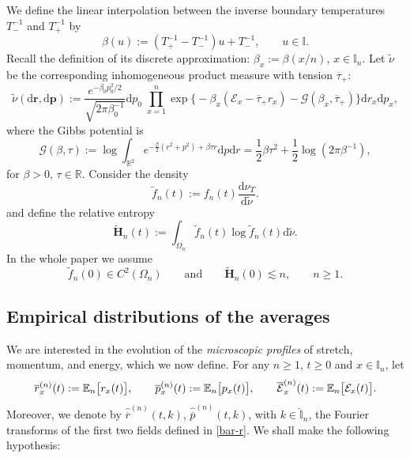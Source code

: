 \documentclass[EJP]{ejpecp} %
\newcommand\bbE{{\mathbb E}}
\newcommand\T{{\mathbb I}}
\newcommand\Om{\Omega}
\renewcommand{\ge}{\geqslant}
\newcommand{\dd  }{\mathrm{d}}
\renewcommand{\hat}{\widehat}
\renewcommand{\tilde}{\widetilde}
\renewcommand{\bar}{\overline}
\numberwithin{equation}{section}
\begin{document}
 We define  the linear interpolation between the inverse boundary temperatures $T_-^{-1}$
and $T_+^{-1}$ by
\begin{equation}
\label{beta}
\beta(u) := \left(T_+^{-1} - T_-^{-1}\right) u +  T_-^{-1},\qquad u\in\T.
\end{equation}
 Recall the definition of its discrete approximation:
  $\beta_x := \beta(x/n)$, $x\in\T_n$. 
Let $\tilde \nu$ be the corresponding inhomogeneous product measure with tension $\bar\tau_+$:
\begin{equation}
  \label{tilde-nu}
  \tilde \nu (\dd \mathbf{r},\dd \mathbf{p}) := \frac{e^{-\beta_0 p_0^2/2}}{\sqrt{2\pi \beta_0^{-1}}} \dd p_0 \; \prod_{x=1}^n
  \exp\big\{-\beta_x\left( \mathcal E_x - \bar\tau_+ r_x\right) -
    \mathcal G(\beta_x,\bar\tau_+)\big\} \dd r_x\dd p_x,
\end{equation}
where the Gibbs potential is
\begin{equation}
  \label{eq:16}
  \mathcal G(\beta,\tau):= \log\int_{\mathbb R^2} e^{-\frac{\beta}{2} (r^2+p^2)+ \beta \tau r} \dd p \dd r = \frac 12 \beta \tau^2
  + \frac12\log \left(2\pi \beta^{-1}\right),
\end{equation}
for $ \beta>0,\,\tau\in\mathbb R. $
Consider the 
density 
\begin{equation}
\tilde f_n(t) := f_n(t) \frac { \dd \nu_{T}}{ \dd \tilde{\nu}}. \label{eq:tildef}
\end{equation}
and define
the relative entropy
\begin{equation}
  \label{eq:7}
 \tilde{\mathbf{H}}_n(t) := \int_{\Om_n} \tilde f_n(t) \log\tilde f_n(t) \dd \tilde{\nu}.
\end{equation}
In the whole paper we assume \begin{equation}
\label{eq:ass0}
\tilde f_n(0)\in C^2(\Omega_n) \qquad \text{and} \qquad \tilde{\mathbf{H}}_n(0) \lesssim n, \qquad n \geqslant 1.
\end{equation}



\subsection{Empirical distributions of the averages}

We are interested in the evolution of the \emph{microscopic profiles}
of stretch, momentum, and energy, which we now define. For any
$n\ge 1$, $t\ge0$ and $x \in \T_n$, let
\begin{equation}
\label{bar-r}
\bar r_x^{(n)}(t):=\bbE_n \big[r_x(t)\big], \qquad 
\bar p_x^{(n)}(t):=\bbE_n
\big[p_x(t)\big], 
\qquad \bar{\cal E}_x^{(n)}(t):=\bbE_n \big[{\cal E}_x(t)\big].
\end{equation}
Moreover, we denote by $\widehat{\bar r}^{(n)}(t,k)$, $\widehat{\bar
  p}^{(n)}(t,k)$, with $k\in\hat\T_n$,  the Fourier
transforms of the first two fields defined in \eqref{bar-r}.
We shall make the following hypothesis: 
\end{document}
